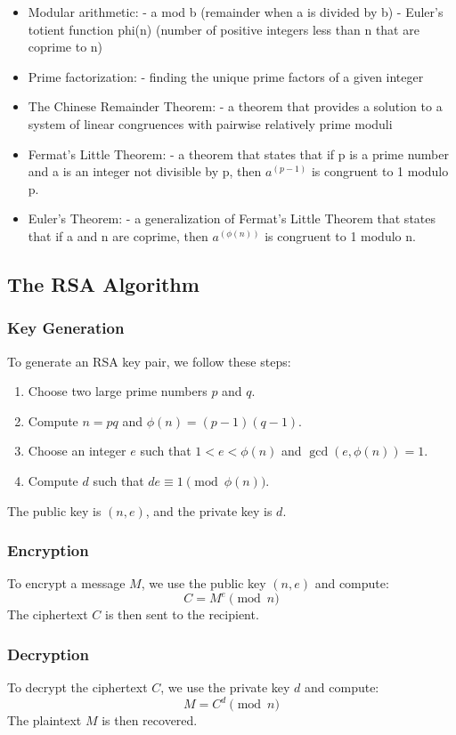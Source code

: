 \documentclass[12pt,openany]{book}
\begin{document}
	
	\begin{itemize}
		\item Modular arithmetic:
		- a mod b (remainder when a is divided by b)
		- Euler's totient function phi(n) (number of positive integers less than n that are coprime to n)
		\item Prime factorization:
		- finding the unique prime factors of a given integer
		\item The Chinese Remainder Theorem:
		- a theorem that provides a solution to a system of linear congruences with pairwise relatively prime moduli
		\item Fermat's Little Theorem:
		- a theorem that states that if p is a prime number and a is an integer not divisible by p, then $a^{(p-1)}$ is congruent to 1 modulo p.
		\item Euler's Theorem:
		- a generalization of Fermat's Little Theorem that states that if a and n are coprime, then $a^{(\phi(n))}$ is congruent to 1 modulo n.
	\end{itemize}
	
	\subsection{The RSA Algorithm}
	
	\subsubsection{Key Generation}
	To generate an RSA key pair, we follow these steps:
	\begin{enumerate}
		\item Choose two large prime numbers $p$ and $q$.
		\item Compute $n = pq$ and $\phi(n) = (p-1)(q-1)$.
		\item Choose an integer $e$ such that $1 < e < \phi(n)$ and $\gcd(e, \phi(n)) = 1$.
		\item Compute $d$ such that $de \equiv 1 \pmod{\phi(n)}$.
	\end{enumerate}
	The public key is $(n, e)$, and the private key is $d$.
	
	\subsubsection{Encryption}
	To encrypt a message $M$, we use the public key $(n, e)$ and compute:
	$$C = M^e \pmod{n}$$
	The ciphertext $C$ is then sent to the recipient.
	
	\subsubsection{Decryption}
	To decrypt the ciphertext $C$, we use the private key $d$ and compute:
	$$M = C^d \pmod{n}$$
	The plaintext $M$ is then recovered.
	
\end{document}
